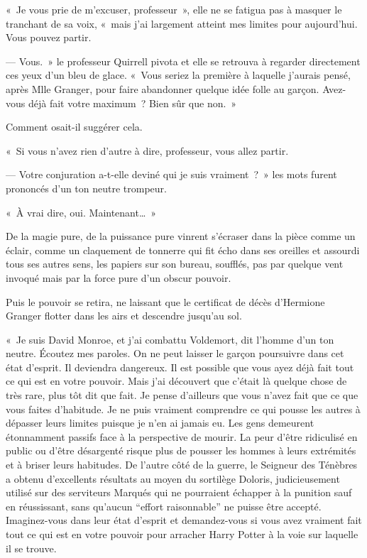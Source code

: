 «~Je vous prie de m'excuser, professeur~», elle ne se fatigua pas à masquer le tranchant de sa voix, «~mais j'ai largement atteint mes limites pour aujourd'hui. Vous pouvez partir.

--- Vous.~» le professeur Quirrell pivota et elle se retrouva à regarder directement ces yeux d'un bleu de glace. «~Vous seriez la première à laquelle j'aurais pensé, après Mlle Granger, pour faire abandonner quelque idée folle au garçon. Avez-vous déjà fait votre maximum~? Bien sûr que non.~»

Comment osait-il suggérer cela.

«~Si vous n'avez rien d'autre à dire, professeur, vous allez partir.

--- Votre conjuration a-t-elle deviné qui je suis vraiment~?~» les mots furent prononcés d'un ton neutre trompeur.

«~À vrai dire, oui. Maintenant…~»

De la magie pure, de la puissance pure vinrent s'écraser dans la pièce comme un éclair, comme un claquement de tonnerre qui fit écho dans ses oreilles et assourdi tous ses autres sens, les papiers sur son bureau, soufflés, pas par quelque vent invoqué mais par la force pure d'un obscur pouvoir.

Puis le pouvoir se retira, ne laissant que le certificat de décès d'Hermione Granger flotter dans les airs et descendre jusqu'au sol.

«~Je suis David Monroe, et j'ai combattu Voldemort, dit l'homme d'un ton neutre. Écoutez mes paroles. On ne peut laisser le garçon poursuivre dans cet état d'esprit. Il deviendra dangereux. Il est possible que vous ayez déjà fait tout ce qui est en votre pouvoir. Mais j'ai découvert que c'était là quelque chose de très rare, plus tôt dit que fait. Je pense d'ailleurs que vous n'avez fait que ce que vous faites d'habitude. Je ne puis vraiment comprendre ce qui pousse les autres à dépasser leurs limites puisque je n'en ai jamais eu. Les gens demeurent étonnamment passifs face à la perspective de mourir. La peur d'être ridiculisé en public ou d'être désargenté risque plus de pousser les hommes à leurs extrémités et à briser leurs habitudes. De l'autre côté de la guerre, le Seigneur des Ténèbres a obtenu d'excellents résultats au moyen du sortilège Doloris, judicieusement utilisé sur des serviteurs Marqués qui ne pourraient échapper à la punition sauf en réussissant, sans qu'aucun “effort raisonnable” ne puisse être accepté. Imaginez-vous dans leur état d'esprit et demandez-vous si vous avez vraiment fait tout ce qui est en votre pouvoir pour arracher Harry Potter à la voie sur laquelle il se trouve.

